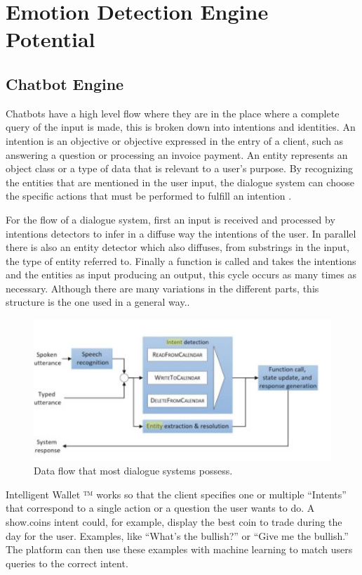\documentclass[	DIV=calc,%
							paper=letter,%
							fontsize=12pt%
                            ]{scrartcl}	 					%
\begin{document}
\section{\label{sec:level1}Emotion Detection Engine Potential}

\subsection{\label{sec:level1}Chatbot Engine}
Chatbots have a high level flow where they are in the place where a complete query of the input is made, this is broken down into intentions and identities. An intention is an objective or objective expressed in the entry of a client, such as answering a question or processing an invoice payment. An entity represents an object class or a type of data that is relevant to a user's purpose. By recognizing the entities that are mentioned in the user input, the dialogue system can choose the specific actions that must be performed to fulfill an intention \cite{lee2015natural_sn} \cite{7419068Perzylo_sn}.

For the flow of a dialogue system, first an input is received and processed by intentions detectors to infer in a diffuse way the intentions of the user. In parallel there is also an entity detector which also diffuses, from substrings in the input, the type of entity referred to. Finally a function is called and takes the intentions and the entities as input producing an output, this cycle occurs as many times as necessary. Although there are many variations in the different parts, this structure is the one used in a general way.\cite{lee2015natural_sn}.


\begin{figure}[H]
\centering
\includegraphics[scale=1.5]{img/Pipeline.JPG}
\caption{Data flow that most dialogue systems possess.}
\label{DiagIntent}
\end{figure}


Intelligent Wallet ™ works so that the client specifies one or multiple “Intents” that correspond to a single action or a question the user wants to do. A show.coins intent could, for example, display the best coin to trade during the day for the user. Examples, like “What’s the bullish?” or “Give me the bullish.” The platform can then use these examples with machine learning to match users queries to the correct intent.
\end{document}
